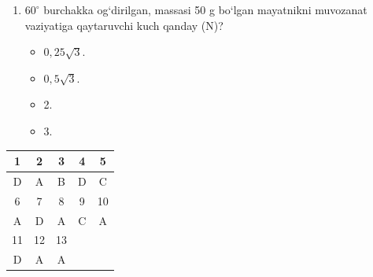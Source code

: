 \begin{enumerate}
\begin{itemize}
    \end{itemize}

    \item $60^\circ$ burchakka og‘dirilgan, massasi 50 g bo‘lgan mayatnikni muvozanat vaziyatiga qaytaruvchi kuch qanday (N)?
    \begin{itemize}
        \item[A)] $0,25\sqrt{3}$.
        \item[B)] $0,5\sqrt{3}$.
        \item[C)] 2.
        \item[D)] 3.
        
    \end{itemize}
\end{enumerate}




\begin{center}
\begin{tabular}{|c|c|c|c|c|}
\hline
1 & 2 & 3 & 4 & 5 \\
\hline
D & A & B & D & C \\
\hline
6 & 7 & 8 & 9 & 10 \\
\hline
A & D & A & C & A \\
\hline
11 & 12 & 13 & & \\
\hline
D & A & A & & \\
\hline
\end{tabular}
\end{center}